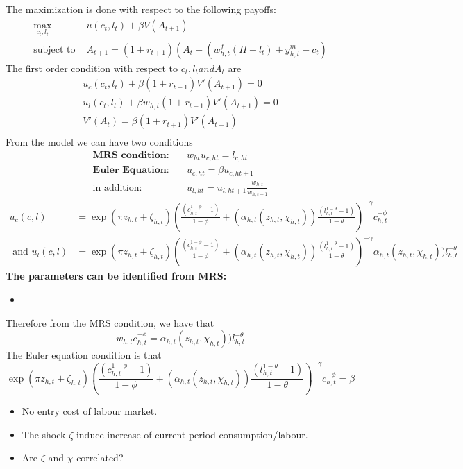 The maximization is done with respect to the following payoffs:
\[\begin{split} \max_{c_t,l_t} & u(c_t,l_t) + \beta V(A_{t+1}) \\
\text{subject to } & A_{t+1} = (1 + r_{t+1}) \left( A_{t} + \left(w_{h,t}^f(H-l_{t}) + y_{h,t}^m - c_{t} \right)
\end{split}\]
The first order condition with respect to $c_t, l_t and A_t$ are \[ \begin{split}
  u_c(c_t,l_t) + \beta (1+r_{t+1}) V'(A_{t+1}) = 0 \\
  u_l(c_t,l_t) + \beta w_{h,t} (1+r_{t+1}) V'(A_{t+1}) = 0 \\
  V'(A_t) = \beta (1+r_{t+1}) V'(A_{t+1}) \\
\end{split} \]
From the model we can have two conditions
\[ \begin{split}
  \textbf{MRS condition:}& \quad w_{ht} u_{c,ht} = l_{c,ht}\\
  \textbf{Euler Equation:}& \quad u_{c,ht} = \beta u_{c,ht+1}\\
  \text{in addition:}& \quad u_{l,ht} = u_{l,ht+1} \frac{w_{h,t}}{w_{h,t+1}}
\end{split} \]
\[ \begin{split}
u_c(c,l) & = \exp{( \pi z_{h,t} + \zeta_{h,t} )} \left( \frac{(c_{h,t}^{1 - \phi} - 1)}{1 - \phi} + (\alpha_{h,t}(z_{h,t},\chi_{h,t})) \frac{(l_{h,t}^{1 - \theta} -1)}{ 1 - \theta}\right)^{-\gamma} c_{h,t}^{-\phi} \\ \text{ and }u_l(c,l) & = \exp{( \pi z_{h,t} + \zeta_{h,t} )} \left( \frac{(c_{h,t}^{1 - \phi} - 1)}{1 - \phi} + (\alpha_{h,t}(z_{h,t},\chi_{h,t})) \frac{(l_{h,t}^{1 - \theta} -1)}{ 1 - \theta}\right)^{-\gamma} \alpha_{h,t}(z_{h,t},\chi_{h,t})) l_{h,t}^{-\theta}  \end{split}\]
 \textbf{The parameters can be identified from MRS:}
 \begin{itemize}
   \item 
 \end{itemize}
Therefore from the MRS condition, we have that
\[ w_{h,t}c_{h,t}^{-\phi} =\alpha_{h,t}(z_{h,t},\chi_{h,t})) l_{h,t}^{-\theta}  \]
The Euler equation condition is that
\[ \exp{( \pi z_{h,t} + \zeta_{h,t} )} \left( \frac{(c_{h,t}^{1 - \phi} - 1)}{1 - \phi} + (\alpha_{h,t}(z_{h,t},\chi_{h,t})) \frac{(l_{h,t}^{1 - \theta} -1)}{ 1 - \theta}\right)^{-\gamma} c_{h,t}^{-\phi} = \beta \]
\begin{itemize}
  \item No entry cost of labour market.
  \item The shock $\zeta$ induce increase of current period consumption/labour.
  \item Are $\zeta$ and $\chi$ correlated?
\end{itemize}

